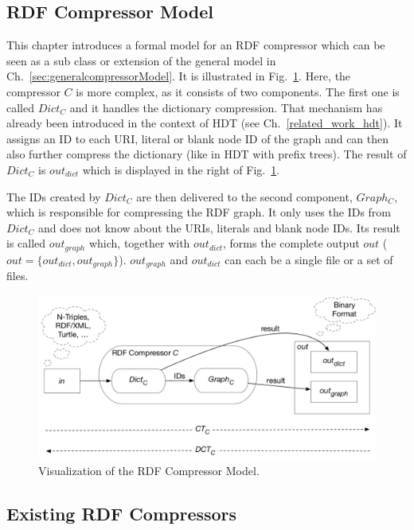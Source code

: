 \subsection{RDF Compressor Model}\label{sec:compressorModel}

This chapter introduces a formal model for an RDF compressor which can be seen as a sub class or extension of the general model in Ch.~\ref{sec:generalcompressorModel}. It is illustrated in Fig.~\ref{fig:compressorModel}. Here, the compressor $C$ is more complex, as it consists of two components. The first one is called $Dict_C$ and it handles the dictionary compression. That mechanism has already been introduced in the context of HDT (see Ch.~\ref{related_work_hdt}). It assigns an ID to each URI, literal or blank node ID of the graph and can then also further compress the dictionary (like in HDT with prefix trees). The result of $Dict_C$ is $out_{dict}$ which is displayed in the right of Fig.~\ref{fig:compressorModel}. 

The IDs created by $Dict_C$ are then delivered to the second component, $Graph_C$, which is responsible for compressing the RDF graph. It only uses the IDs from $Dict_C$ and does not know about the URIs, literals and blank node IDs. Its result is called $out_{graph}$ which, together with $out_{dict}$, forms the complete output $out$ ($out=\{out_{dict}, out_{graph}\} $). $out_{graph}$ and $out_{dict}$ can each be a single file or a set of files. 

\begin{figure}
	\centering
	\includegraphics[width=\linewidth]{figures/approach/model}
	\caption{Visualization of the RDF Compressor Model.}
	\label{fig:compressorModel}
\end{figure}


\subsection{Existing RDF  Compressors}

